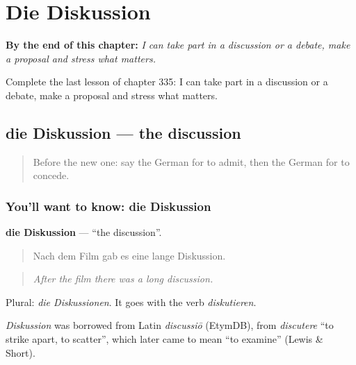 
\chapter{Die Diskussion}
\label{ch:ge-die-diskussion}

\begin{chapteropening}
\textbf{By the end of this chapter:} \emph{I can take part in a discussion or a debate, make a proposal and stress what matters.}

Complete the last lesson of chapter 335: I can take part in a discussion or a debate, make a proposal and stress what matters.
\end{chapteropening}

\section[die Diskussion]{die Diskussion — the discussion}

\label{lesson:GE-C335-diskussion}



\begin{quote}
Before the new one: say the German for to admit, then the German for to concede.
\end{quote}

\subsection*{You'll want to know: die Diskussion}
\textbf{die Diskussion} — \textquotedblleft{}the discussion\textquotedblright{}.

\begin{quote}
Nach dem Film gab es eine lange Diskussion.
\end{quote}

\begin{quote}
\emph{After the film there was a long discussion.}
\end{quote}

Plural: \emph{die Diskussionen}. It goes with the verb \emph{diskutieren}.

\begin{cousinweb}
\emph{Diskussion} was borrowed from Latin \emph{discussiō} (EtymDB), from \emph{discutere} \textquotedblleft{}to strike apart, to scatter\textquotedblright{}, which later came to mean \textquotedblleft{}to examine\textquotedblright{} (Lewis \& Short).
\end{cousinweb}

